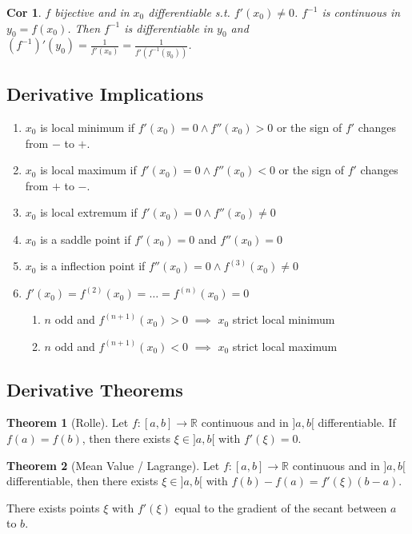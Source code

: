 \documentclass[a4paper, 10pt]{article}
\newtheorem*{corollary}{Cor}
\theoremstyle{definition}
\theoremstyle{ex}
\theoremstyle{named}
\newtheorem*{ntheorem_wrapper}{Theorem}
\newenvironment{ntheorem}%
    {\begin{mdframed}[style=important]\begin{ntheorem_wrapper}}%
    {\end{ntheorem_wrapper}\end{mdframed}}
\newcommand{\R}{\mathbb{R}}
\begin{document}
\begin{corollary}
    $f$ bijective and in $x_0$ differentiable s.t. $f'(x_0) \neq 0$. $f^{-1}$ is continuous in $y_0 = f(x_0)$. Then $f^{-1}$ is differentiable in $y_0$ and $(f^{-1})'(y_0) = \frac{1}{f'(x_0)} = \frac{1}{f'(f^{-1}(y_0))}$. 
\end{corollary}

\subsection{Derivative Implications}
\begin{enumerate}
    \item $x_0$ is local minimum if $f'(x_0) = 0 \land f''(x_0) > 0$ or the sign of $f'$ changes from $-$ to $+$.
    \item $x_0$ is local maximum if $f'(x_0) = 0 \land f''(x_0) < 0$ or the sign of $f'$ changes from $+$ to $-$.
    \item $x_0$ is local extremum if $f'(x_0) = 0 \land f''(x_0) \neq 0$
    \item $x_0$ is a saddle point if $f'(x_0) = 0$ and $f''(x_0) = 0$
    \item $x_0$ is a inflection point if $f''(x_0) = 0 \land f^{(3)}(x_0) \neq 0$
    \item $f'(x_0) = f^{(2)}(x_0) = \ldots = f^{(n)}(x_0) = 0$
    \begin{enumerate}
        \item $n$ odd and $f^{(n+1)}(x_0) > 0$ $\implies$ $x_0$ strict local minimum
        \item $n$ odd and $f^{(n+1)}(x_0) < 0$ $\implies$ $x_0$ strict local maximum
    \end{enumerate}
\end{enumerate}

\subsection{Derivative Theorems}
\begin{ntheorem}[Rolle]
    Let $f: [a, b] \to \R$ continuous and in $]a, b[$ differentiable. If $f(a) = f(b)$, then there exists $\xi \in ]a, b[$ with $f'(\xi) = 0$.
\end{ntheorem}

\begin{ntheorem}[Mean Value / Lagrange]
    Let $f: [a, b] \to \R$ continuous and in $]a, b[$ differentiable, then there exists $\xi \in ]a, b[$ with $f(b) - f(a) = f'(\xi)(b-a)$.

    There exists points $\xi$ with $f'(\xi)$ equal to the gradient of the secant between $a$ to $b$.
\end{ntheorem}
\end{document}
